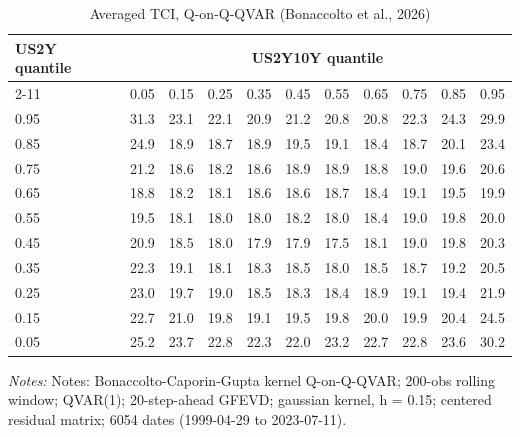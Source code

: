 \begin{table}[htbp]\centering
\caption{Averaged TCI, Q-on-Q-QVAR (Bonaccolto et al., 2026)}\label{tab:qqconn}
\small
\begin{tabular}{lcccccccccc}
\toprule
US2Y quantile & \multicolumn{10}{c}{US2Y10Y quantile} \\
\cmidrule(lr){2-11}
 & 0.05 & 0.15 & 0.25 & 0.35 & 0.45 & 0.55 & 0.65 & 0.75 & 0.85 & 0.95 \\
\midrule
0.95 & 31.3 & 23.1 & 22.1 & 20.9 & 21.2 & 20.8 & 20.8 & 22.3 & 24.3 & 29.9 \\
0.85 & 24.9 & 18.9 & 18.7 & 18.9 & 19.5 & 19.1 & 18.4 & 18.7 & 20.1 & 23.4 \\
0.75 & 21.2 & 18.6 & 18.2 & 18.6 & 18.9 & 18.9 & 18.8 & 19.0 & 19.6 & 20.6 \\
0.65 & 18.8 & 18.2 & 18.1 & 18.6 & 18.6 & 18.7 & 18.4 & 19.1 & 19.5 & 19.9 \\
0.55 & 19.5 & 18.1 & 18.0 & 18.0 & 18.2 & 18.0 & 18.4 & 19.0 & 19.8 & 20.0 \\
0.45 & 20.9 & 18.5 & 18.0 & 17.9 & 17.9 & 17.5 & 18.1 & 19.0 & 19.8 & 20.3 \\
0.35 & 22.3 & 19.1 & 18.1 & 18.3 & 18.5 & 18.0 & 18.5 & 18.7 & 19.2 & 20.5 \\
0.25 & 23.0 & 19.7 & 19.0 & 18.5 & 18.3 & 18.4 & 18.9 & 19.1 & 19.4 & 21.9 \\
0.15 & 22.7 & 21.0 & 19.8 & 19.1 & 19.5 & 19.8 & 20.0 & 19.9 & 20.4 & 24.5 \\
0.05 & 25.2 & 23.7 & 22.8 & 22.3 & 22.0 & 23.2 & 22.7 & 22.8 & 23.6 & 30.2 \\
\bottomrule
\end{tabular}
\par\smallskip\begin{minipage}{0.95\linewidth}\footnotesize\textit{Notes:} Notes: Bonaccolto-Caporin-Gupta kernel Q-on-Q-QVAR; 200-obs rolling window; QVAR(1); 20-step-ahead GFEVD; gaussian kernel, h = 0.15; centered residual matrix; 6054 dates (1999-04-29 to 2023-07-11).\end{minipage}
\end{table}